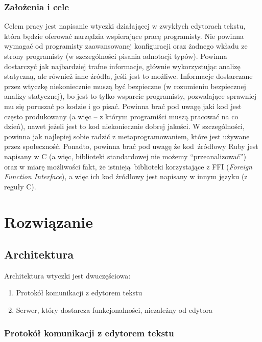 \documentclass[shortabstract,mgr]{iithesis}
\begin{document}
\subsection{Założenia i cele}

Celem pracy jest napisanie wtyczki działającej w zwykłych edytorach tekstu, która będzie oferować narzędzia wspierające pracę programisty.
Nie powinna wymagać od programisty zaawansowanej konfiguracji oraz żadnego wkładu ze strony programisty (w szczególności pisania adnotacji typów).
Powinna dostarczyć jak najbardziej trafne informacje, głównie wykorzystując analizę statyczną, ale również inne źródła, jeśli jest to możliwe.
Informacje dostarczane przez wtyczkę niekoniecznie muszą być bezpieczne (w rozumieniu bezpiecznej analizy statycznej), bo jest to tylko wsparcie programisty, pozwalające sprawniej mu się poruszać po kodzie i go pisać.
Powinna brać pod uwagę jaki kod jest często produkowany (a więc -- z którym programiści muszą pracować na co dzień), nawet jeżeli jest to kod niekoniecznie dobrej jakości.
W szczególności, powinna jak najlepiej sobie radzić z metaprogramowaniem, które jest używane przez społeczność.
Ponadto, powinna brać pod uwagę że kod źródłowy Ruby jest napisany w C (a więc, biblioteki standardowej nie możemy ``przeanalizować'') oraz w miarę możliwości fakt, że istnieją biblioteki korzystające z FFI (\textit{Foreign Function Interface}), a więc ich kod źródłowy jest napisany w innym języku (z reguły C).

\chapter{Rozwiązanie}

\section{Architektura}

Architektura wtyczki jest dwuczęściowa:
\begin{enumerate}
\item Protokół komunikacji z edytorem tekstu
\item Serwer, który dostarcza funkcjonalności, niezależny od edytora
\end{enumerate}

\subsection{Protokół komunikacji z edytorem tekstu}
\end{document}
